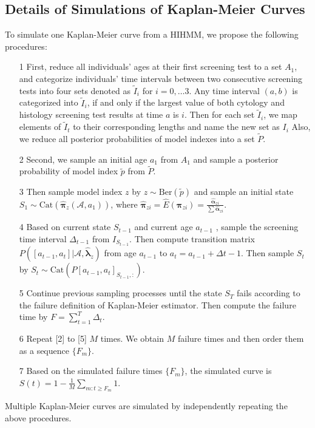 \documentclass{article}
\begin{document}
\subsection{Details of Simulations of Kaplan-Meier Curves}
To simulate one Kaplan-Meier curve from a HIHMM, we propose the following procedures:
\begin{itemize}
	\item[1] First, reduce all individuals' ages at their first screening test to a set $A_1$, and categorize individuals' time intervals between two consecutive screening tests into four sets denoted as $\tilde{I}_i$ for $i = 0,\ldots 3$. Any time interval $(a, b)$ is categorized into $\tilde{I}_i$, if and only if the largest value of both cytology and histology screening test results at time $a$ is $i$. Then for each set $\tilde{I}_i$, we map elements of $\tilde{I}_t$ to their corresponding lengths and name the new set as $I_i$  Also, we reduce all posterior probabilities of model indexes into a set $\tilde{P}$.
	\item[2] Second, we sample an initial age $a_1$ from $A_1$ and sample a posterior probability of model index $\tilde{p}$ from $\tilde{P}$.
	\item[3] Then sample model index $z$ by $z \sim \mathrm{Ber}(\tilde{p})$ and sample an initial state $S_1 \sim \mathrm{Cat}(\hat{\bm \pi}_z(\mathcal{A}, a_1))$, where $\hat{\bm \pi}_{zi} = \hat{E}(\bm \pi_{zi}) = \frac{\hat{\bm \alpha}_{zi}}{\sum \hat{\bm \alpha}_{zi}}$.
	\item[4] Based on current state $S_{t-1}$ and current age $a_{t-1}$ , sample the screening time interval $\Delta_{t-1}$ from $I_{S_{t-1}}$. Then compute transition matrix $P([a_{t-1}, a_{t}]| \mathcal{A}, \hat{\bm \lambda}_z)$ from age $a_{t-1}$ to $a_{t} = a_{t-1} + \Delta {t-1}$. Then sample $S_{t}$ by $S_{t} \sim \mathrm{Cat}(P[a_{t-1}, a_{t}]_{S_{t-1},:}) $.
	\item[5] Continue previous sampling processes until the state $S_T$ fails according to the failure definition of Kaplan-Meier estimator. Then compute the failure time by $F = \sum_{t = 1}^{T}\Delta_t$.
	\item[6] Repeat [2] to [5] $M$ times. We obtain $M$ failure times and then order them as a sequence $\{F_m\}$. 
	\item[7] Based on the simulated failure times $\{F_m\}$, the simulated curve is $S(t) = 1 - \frac{1}{M}\sum_{m: t \geq F_m}1$.
\end{itemize}
Multiple Kaplan-Meier curves are simulated by independently repeating the above procedures.
\end{document}
